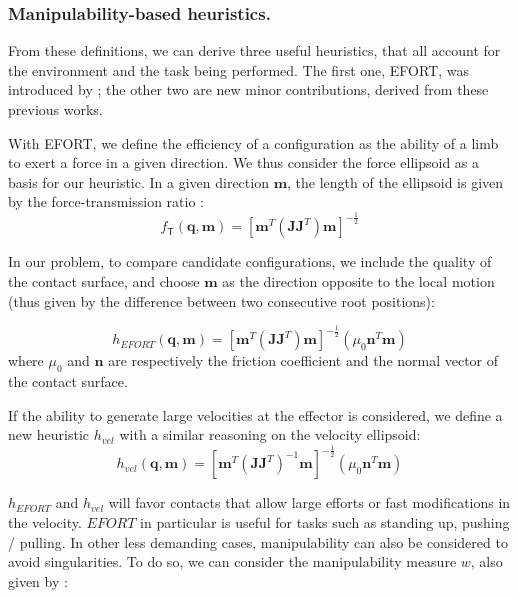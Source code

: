 \subsubsection{Manipulability-based heuristics.}
From these definitions, we can derive three useful heuristics, that all account for the environment and the task being performed.
The first one, EFORT, was introduced by \cite{Tonneau2014}; the other two are new minor contributions, derived from these previous works.

With EFORT, we define the efficiency of a configuration as the ability of a limb to exert a force in a given direction.
We thus consider the force ellipsoid as a basis for our heuristic.
In a given direction $\mathbf{m}$, the length of the ellipsoid is given by the force-transmission ratio \citep{1087795}:
\begin{equation*}
f_\mathsf{T}(\mathbf{q}, \mathbf{m}) = [\mathbf{m}^{T}(\mathbf{J}\mathbf{J}	^{T})\mathbf{m}]^{-\frac{1}{2}}
\end{equation*}

In our problem, to compare candidate configurations, we include the quality of the contact surface, and choose $\mathbf{m}$ as the direction
opposite to the local motion (thus given by the difference between two consecutive root positions):

\begin{equation}
h_{EFORT}(\mathbf{q}, \mathbf{m}) = [\mathbf{m}^{T}(\mathbf{J}\mathbf{J}^T)\mathbf{m}]^{-\frac{1}{2}} ( \mu_0 \mathbf{n}^T \mathbf{m})
\end{equation}
where $\mu_0$ and $\mathbf{n}$ are respectively the friction coefficient and the normal vector of the contact surface.


If the ability to generate large velocities at the effector is considered, we define a new heuristic $h_{vel}$ with a similar reasoning on the velocity ellipsoid:
\begin{equation}
h_{vel}(\mathbf{q}, \mathbf{m}) = [\mathbf{m}^{T}(\mathbf{J}\mathbf{J}^T)^{-1}\mathbf{m}]^{-\frac{1}{2}} ( \mu_0 \mathbf{n}^T \mathbf{m})
\end{equation}

$h_{EFORT}$ and $h_{vel}$ will favor contacts that allow large efforts or fast modifications in the velocity.
$EFORT$ in particular is useful for tasks such as standing up, pushing / pulling.
In other less demanding cases, manipulability can also be considered to avoid singularities.
To do so, we can consider the manipulability measure $w$, also given by \citeauthor{Yoshikawa1984}:

